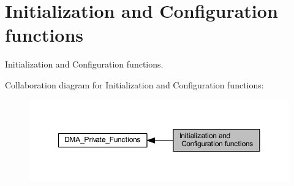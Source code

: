 \hypertarget{group___d_m_a___group1}{}\section{Initialization and Configuration functions}
\label{group___d_m_a___group1}


Initialization and Configuration functions.  


Collaboration diagram for Initialization and Configuration functions\+:
\nopagebreak
\begin{figure}[H]
\begin{center}
\leavevmode
\includegraphics[width=350pt]{group___d_m_a___group1}
\end{center}
\end{figure}
